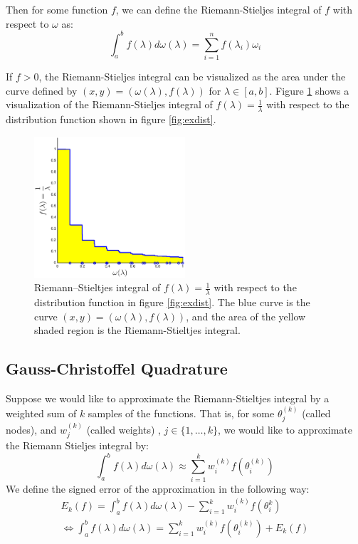 \documentclass[10pt,a4paper]{article}
\begin{document}
Then for some function $f$, we can define the Riemann-Stieljes integral of $f$ with respect to $\omega$ as:
\begin{equation}
\int_a^b f(\lambda) d\omega(\lambda)  = \sum_{i=1}^n f \left( \lambda_i \right) \omega_i
\end{equation}

If $f > 0 $, the Riemann-Stieljes integral can be visualized as the area under the curve defined by $(x,y) = \left( \omega(\lambda) , f(\lambda) \right)$ for $\lambda \in \left[ a, b \right]$. Figure \ref{fig:exint} shows a visualization of the Riemann-Stieljes integral of $f(\lambda) = \frac{1}{\lambda}$ with respect to the distribution function shown in figure \ref{fig:exdist}.

\begin{figure}[h]
  \centering
\includegraphics[width = 0.5\textwidth]{StInteg}
  \caption{Riemann–Stieltjes integral of $f(\lambda) = \frac{1}{\lambda}$ with respect to the distribution function in figure \ref{fig:exdist}. The blue curve is the curve $(x,y)=  (\omega(\lambda), f(\lambda))$, and the area of the yellow shaded region is the Riemann-Stieltjes integral. \label{fig:exint} }
\end{figure}




\subsection{Gauss-Christoffel Quadrature}

Suppose we would like to approximate the Riemann-Stieltjes integral by a weighted sum of $k$ samples of the functions. That is, for some $\theta_j^{(k)}$ (called nodes), and $w_j^{(k)}$ (called weights) , $j \in \{ 1, \dots, k \}$, we would like to approximate the Riemann Stieljes integral by:
\begin{equation}
\int_a^b f(\lambda) d\omega(\lambda) \approx \sum_{i=1}^{k} w_i^{(k)} f(\theta_i^{(k)})
\end{equation}
We define the signed error of the approximation in the following way:
\begin{align}
E_k(f) =  \int_a^b f(\lambda) d\omega(\lambda)  -  \sum_{i=1}^{k} w_i^{(k)} f(\theta_i^k)  \\
\iff \int_a^b f(\lambda) d\omega(\lambda)  =   \sum_{i=1}^{k} w_i^{(k)} f(\theta_i^{(k)})  + E_k(f)
\end{align}
\end{document}
